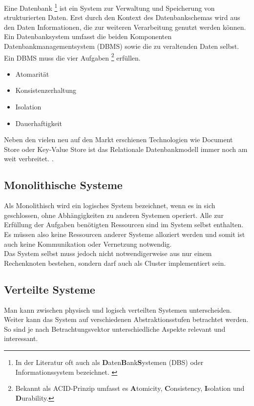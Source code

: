 \documentclass[oneside,11pt,parskip=half,ngerman]{scrreprt}
\begin{document}
Eine Datenbank \footnote{In der Literatur oft auch als
  \textbf{D}aten\textbf{B}ank\textbf{S}ystemen (DBS) oder
  Informationssystem bezeichnet. \autocite[ pp.~3-4]{rupDatenbanken}}
ist ein System zur Verwaltung und Speicherung von strukturierten Daten.
Erst durch den Kontext des Datenbankschemas wird aus den Daten
Informationen, die zur weiteren Verarbeitung genutzt werden können. Ein
Datenbanksystem umfasst die beiden Komponenten Datenbankmanagementsystem
(DBMS) sowie die zu veraltenden Daten selbst.\\Ein DBMS muss die vier
Aufgaben \footnote{Bekannt als ACID-Prinzip \autocite[
  pp.105]{rupDatenbanken} umfasst es \textbf{A}tomicity,
  \textbf{C}onsistency, \textbf{I}solation und \textbf{D}urability.}
erfüllen.

\begin{itemize}
\itemsep1pt\parskip0pt
\item
  Atomarität
\item
  Konsistenzerhaltung
\item
  Isolation
\item
  Dauerhaftigkeit
\end{itemize}

Neben den vielen neu auf den Markt erschienen Technologien wie Document
Store oder Key-Value Store ist das Relationale Datenbankmodell immer
noch am weit verbreitet. \autocite{dbenginesranking}.

\subsection{Monolithische Systeme}\label{monolithische-systeme}

Als Monolithisch wird ein logisches System bezeichnet, wenn es in sich
geschlossen, ohne Abhängigkeiten zu anderen Systemen operiert. Alle zur
Erfüllung der Aufgaben benötigten Ressourcen sind im System selbst
enthalten. Es müssen also keine Ressourcen anderer Systeme alloziert
werden und somit ist auch keine Kommunikation oder Vernetzung
notwendig.\\Das System selbst muss jedoch nicht notwendigerweise aus nur
einem Rechenknoten bestehen, sondern darf auch als Cluster implementiert
sein.

\subsection{Verteilte Systeme}\label{verteilte-systeme}

Man kann zwischen physisch und logisch verteilten Systemen
unterscheiden. Weiter kann das System auf verschiedenen
Abstraktionsstufen betrachtet werden. So sind je nach Betrachtungsvektor
unterschiedliche Aspekte relevant und interessant.
\autocite{ethdistribsystems}
\end{document}
